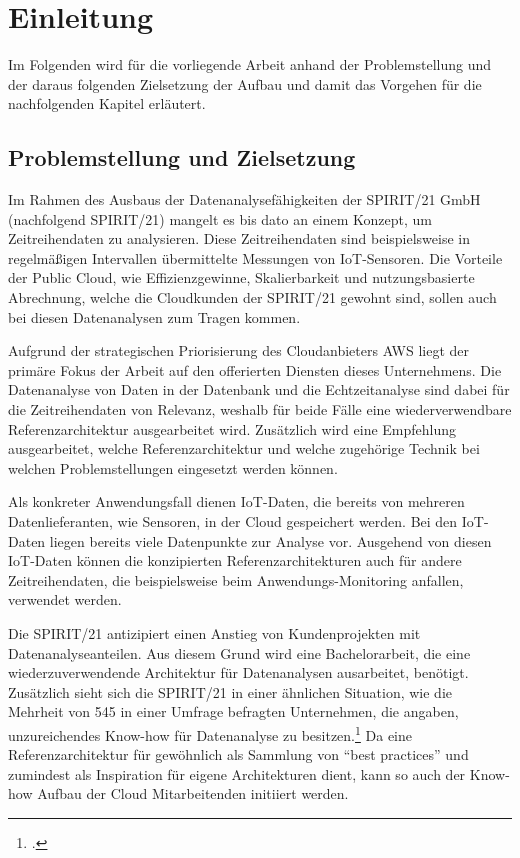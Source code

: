\chapter{Einleitung}\label{chapter:Einleitun}
Im Folgenden wird für die vorliegende Arbeit anhand der Problemstellung und der daraus folgenden Zielsetzung der Aufbau und damit das Vorgehen für die nachfolgenden Kapitel erläutert.
\section{Problemstellung und Zielsetzung}\label{section:Problemstellung-und-Zielsetzun}
Im Rahmen des Ausbaus der Datenanalysefähigkeiten der SPIRIT/21 GmbH (nachfolgend SPIRIT/21) mangelt es bis dato an einem Konzept, um Zeitreihendaten zu analysieren. 
Diese Zeitreihendaten sind beispielsweise in regelmäßigen Intervallen übermittelte Messungen von \acf{IoT}-Sensoren. Die Vorteile der Public Cloud, wie Effizienzgewinne, Skalierbarkeit und nutzungsbasierte Abrechnung, welche die Cloudkunden der SPIRIT/21 gewohnt sind, sollen auch bei diesen Datenanalysen zum Tragen kommen. 

Aufgrund der strategischen Priorisierung des Cloudanbieters \acf{AWS} liegt der primäre Fokus der Arbeit auf den offerierten Diensten dieses Unternehmens.
Die Datenanalyse von Daten in der Datenbank und die Echtzeitanalyse sind dabei für die
Zeitreihendaten von Relevanz, weshalb für beide Fälle eine wiederverwendbare Referenzarchitektur ausgearbeitet wird.
Zusätzlich wird eine Empfehlung ausgearbeitet, welche Referenzarchitektur und welche
zugehörige Technik bei welchen Problemstellungen eingesetzt werden können. 

Als konkreter Anwendungsfall dienen \ac{IoT}-Daten, die bereits von mehreren Datenlieferanten, wie Sensoren, in der Cloud gespeichert werden. Bei den \ac{IoT}-Daten liegen bereits viele Datenpunkte zur Analyse vor. Ausgehend von diesen \ac{IoT}-Daten können die konzipierten Referenzarchitekturen auch für andere Zeitreihendaten, die beispielsweise beim Anwendungs-Monitoring anfallen, verwendet werden. 

Die SPIRIT/21 antizipiert einen Anstieg von Kundenprojekten mit Datenanalyseanteilen. Aus diesem Grund wird eine Bachelorarbeit, die eine wiederzuverwendende Architektur für Datenanalysen ausarbeitet, benötigt. Zusätzlich sieht sich die SPIRIT/21 in einer ähnlichen Situation, wie die Mehrheit von 545 in einer Umfrage befragten Unternehmen, die angaben, unzureichendes Know-how für Datenanalyse zu besitzen.\footcite[Vgl.][]{o.V..o.J.} Da eine Referenzarchitektur für gewöhnlich als Sammlung von \enquote{best practices} und zumindest als Inspiration für eigene Architekturen dient, kann so auch der Know-how Aufbau der Cloud Mitarbeitenden initiiert werden.

